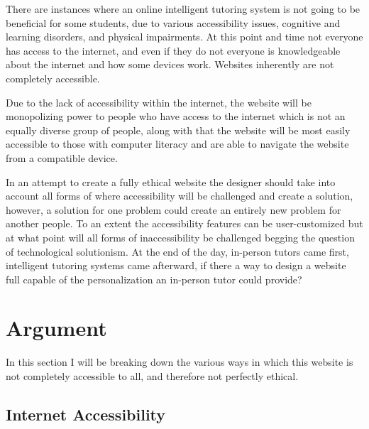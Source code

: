 \documentclass[10pt,twocolumn]{article}
\begin{document}
There are instances where an online intelligent tutoring system is not going to be beneficial for some students, due to various accessibility issues, cognitive and learning disorders, and physical impairments. At this point and time not everyone has access to the internet, and even if they do not everyone is knowledgeable about the internet and how some devices work. Websites inherently are not completely accessible.

Due to the lack of accessibility within the internet, the website will be monopolizing power to people who have access to the internet which is not an equally diverse group of people, along with that the website will be most easily accessible to those with computer literacy and are able to navigate the website from a compatible device. 

In an attempt to create a fully ethical website the designer should take into account all forms of where accessibility will be challenged and create a solution, however, a solution for one problem could create an entirely new problem for another people. To an extent the accessibility features can be user-customized but at what point will all forms of inaccessibility be challenged begging the question of technological solutionism. At the end of the day, in-person tutors came first, intelligent tutoring systems came afterward, if there a way to design a website full capable of the personalization an in-person tutor could provide?

\section{Argument}
In this section I will be breaking down the various ways in which this website is not completely accessible to all, and therefore not perfectly ethical.
\subsection{Internet Accessibility}
\end{document}
